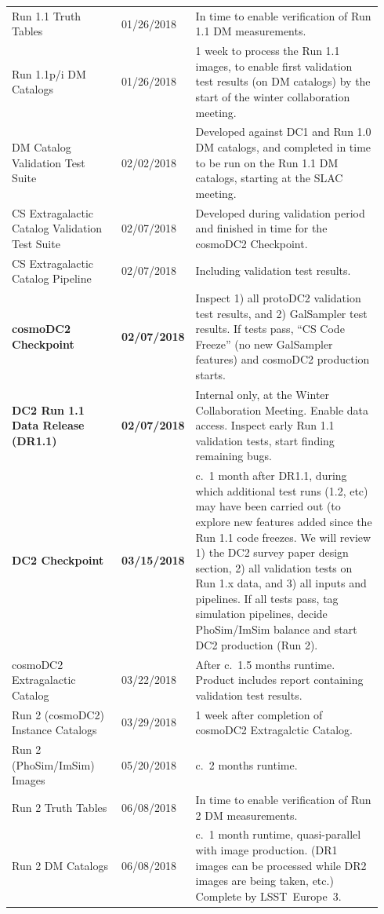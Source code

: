 \documentclass[preprint,times]{aastex61}
\begin{document}
\begin{table}[!htb]
\begin{tabular}{|L{0.3\linewidth}|C{0.11\linewidth}|L{0.53\linewidth}|}
    Run 1.1 Truth Tables                     & 01/26/2018 & In time to enable verification of Run 1.1 DM measurements. \\    
    Run 1.1p/i DM Catalogs                      & 01/26/2018 & 1 week to process the Run 1.1 images, to enable first validation test results (on DM catalogs) by the start of the winter collaboration meeting. \\ 
    DM Catalog Validation Test Suite         & 02/02/2018 & Developed against DC1 and Run 1.0 DM catalogs, and completed in time to be run on the Run 1.1 DM catalogs, starting at the SLAC meeting. \\ 
    CS Extragalactic Catalog Validation Test Suite & 02/07/2018 & Developed during validation period and finished in time for the cosmoDC2 Checkpoint.\\
    CS Extragalactic Catalog Pipeline      & 02/07/2018 & Including validation test results. \\
    \textbf{cosmoDC2 Checkpoint}           & \textbf{02/07/2018} & Inspect 1) all protoDC2 validation test results, and 2) GalSampler test results. If tests pass, ``CS Code Freeze'' (no new GalSampler features) and cosmoDC2 production starts. \\
   \textbf{DC2 Run 1.1 Data Release (DR1.1)}           & \textbf{02/07/2018} & Internal only, at the Winter Collaboration Meeting. Enable data access. Inspect early Run 1.1 validation tests, start finding remaining bugs. \\
    \textbf{DC2 Checkpoint}            & \textbf{03/15/2018} & c.\ 1 month after DR1.1, during which additional test runs (1.2, etc) may have been carried out (to explore new features added since the Run 1.1 code freezes. We will review 1) the DC2 survey paper design section, 2) all validation tests on Run 1.x data, and 3) all inputs and pipelines. If all tests pass, tag simulation pipelines, decide PhoSim/ImSim balance  and start DC2 production (Run 2).\\
    cosmoDC2 Extragalactic Catalog           & 03/22/2018 & After c.\ 1.5 months runtime. Product includes report containing validation test results. \\
    Run 2 (cosmoDC2) Instance Catalogs       & 03/29/2018 & 1 week after completion of cosmoDC2 Extragalctic Catalog.\\ 
    Run 2 (PhoSim/ImSim) Images              & 05/20/2018 & c.\ 2 months runtime.\\ 
    Run 2 Truth Tables                     & 06/08/2018 & In time to enable verification of Run 2 DM measurements. \\      Run 2 DM Catalogs                        & 06/08/2018 & c.\ 1 month runtime, quasi-parallel with image production. (DR1 images can be processed while DR2 images are being taken, etc.) Complete by LSST~Europe~3.\\

\end{tabular}
\end{table}
\end{document}
